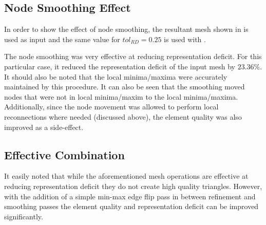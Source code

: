 \subsection{Node Smoothing Effect}
In order to show the effect of node smoothing, the resultant mesh shown
in  is used as input and the same value for
$tol_{RD} = 0.25$ is used with .

\begin{figure}[h!]
  \centering
  \label{fig_NodeSmoothing}
 

\end{figure}

The node smoothing was very effective at reducing representation
deficit. For this particular case, it reduced the representation deficit
of the input mesh by $23.36\%$. It should also be noted that the local
minima/maxima were accurately maintained by this procedure. It can also be seen
that the smoothing moved nodes that were not in local minima/maxim to the
local minima/maxima. Additionally, since the node movement was allowed to
perform local reconnections where needed (discussed above), the element
quality was also improved as a side-effect.

\subsection{Effective Combination}
It easily noted that while the aforementioned mesh operations are
effective at reducing representation deficit they do not create high
quality triangles. However, with the addition of a simple min-max edge
flip pass in between refinement and smoothing passes the element quality
and representation deficit can be improved significantly.

